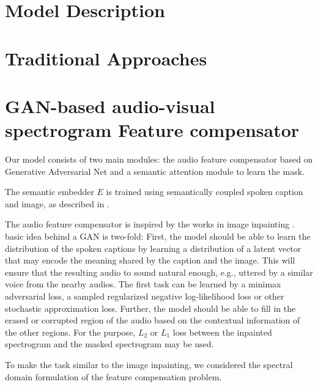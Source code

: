 \documentclass[a4paper]{article}
\begin{document}
\section{Model Description}
\section{Traditional Approaches}

\section{GAN-based audio-visual spectrogram Feature compensator}
Our model consists of two main modules: 
the audio feature compensator based on Generative Adversarial Net
and a semantic attention module to learn the mask. 

The semantic embedder $E$ is trained
using semantically coupled spoken caption and image, as described in
\cite{Harwath17}.

The audio feature compensator is inspired by the works in image inpainting \cite{Yeh17}.
basic idea behind a GAN is two-fold: First, the model should be
able to learn the distribution of the 
spoken captions by learning a distribution of a latent vector that
may encode the meaning shared by the caption and the image. This will
ensure that the resulting audio to sound natural enough, e.g., uttered
by a similar voice from the nearby audios. The first
task can be learned by a minimax adversarial loss, a sampled regularized
 negative log-likelihood loss or other stochastic approximation loss. 
 Further, the model should be able to fill in the erased or corrupted 
 region of the audio based on the contextual information of the other regions. For the purpose, $L_2$ or $L_1$ loss between the inpainted
 spectrogram and the masked spectrogram may be used.
 
To make the task similar to the image inpainting, we considered the spectral domain
formulation of the feature compensation problem.

\begin{comment}
$\mathbf{Y}$ is then embedded by the pretrained embedder $E$:
\begin{align}
    \mathbf{z} = E(\mathbf{Y}_M).
\end{align}
\end{comment}
\end{document}
